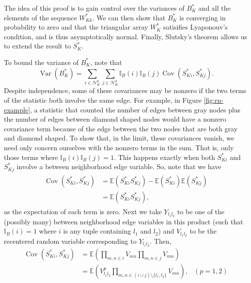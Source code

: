 \documentclass[12pt,twoside]{reedthesis}
\theoremstyle{definition}
\theoremstyle{definition}
\theoremstyle{remark}
\begin{document}
The idea of this proof is to gain control over the variances of
\(B^{\ast}_{K}\) and all the elements of the sequence \(W^{\ast}_{Kk}\).
We can then show that \(B^{\ast}_{K}\) is converging in probability to
zero and that the triangular array \(W^{\ast}_{K}\) satisifies
Lyaponouv's condition, and is thus asymptotically normal. Finally,
Slutsky's theorem allows us to extend the result to \(S^{\ast}_{K}\).

To bound the variance of \(B^{\ast}_{K}\), note that
\begin{equation*}
\operatorname{Var}(B^{\ast}_{K}) = \sum_{i \in \mathcal{N}_{K}^d} \sum_{j \in \mathcal{N}_{K}^d} \mathbb{I}_{B}(i) \mathbb{I}_{B}(j) \operatorname{Cov}(S^{\ast}_{Ki}, S^{\ast}_{Kj}).
\end{equation*}
Despite independence, some of these covariances may be nonzero if the
two terms of the statistic both involve the same edge. For example, in
Figure \ref{fig:rn-example}, a statistic that counted the number of
edges between gray nodes plus the number of edges between diamond shaped
nodes would have a nonzero covariance term because of the edge between
the two nodes that are both gray and diamond shaped. To show that, in
the limit, these covariances vanish, we need only concern ourselves with
the nonzero terms in the sum. That is, only those terms where
\(\mathbb{I}_{B}(i) \mathbb{I}_{B}(j) = 1\). This happens exactly when
both \(S^{\ast}_{Ki}\) and \(S^{\ast}_{Kj}\) involve a between
neighborhood edge variable. So, note that we have
\begin{align}
  \begin{split}
  \operatorname{Cov}(S^{\ast}_{Ki}, S^{\ast}_{Kj}) &= \mathbb{E}(S^{\ast}_{Ki} S^{\ast}_{Kj}) - \mathbb{E}(S^{\ast}_{Ki}) \mathbb{E}(S^{\ast}_{Kj}) \\
  &= \mathbb{E}(S^{\ast}_{Ki}S^{\ast}_{Kj}),
\end{split}
\end{align}
as the expectation of each term is zero. Next we take \(Y_{l_1 l_2}\) to
be one of the (possibly many) between neighborhood edge variables in
this product (such that \(\mathbb{I}_B(i) = 1\) where \(i\) is any tuple
containing \(l_1\) and \(l_2\)) and \(V_{l_1 l_2}\) to be the recentered
random variable corresponding to \(Y_{l_1 l_2}\). Then,
\begin{align*}
\operatorname{Cov}(S^{\ast}_{Ki}, S^{\ast}_{Kj}) &= \mathbb{E}\left( \prod_{m,n \in i} V_{mn} \prod_{m,n \in j} V_{mn} \right) \\
                     &= \mathbb{E}\left( V_{l_1 l_2}^p \prod_{m,n \in (i \cup j) \setminus \{l_1, l_2\}} V_{mn} \right), & (p = 1,2)
\end{align*}
\end{document}

